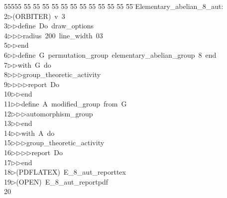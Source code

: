 %
%
\begin{tabbing}
55555 \= 55 \= 55 \= 55 \= 55 \= 55 \= 55 \= 55 \= 55 \= 55 \= 55 \= 55 \= 55 \= \>Elementary\_abelian\_8\_aut:\\[0pt]
2\>$\triangleright$\>(ORBITER)\ v\ 3\ \\[0pt]
3\>$\triangleright$\>$\triangleright$\>define\ Do\ draw\_options\ \\[0pt]
4\>$\triangleright$\>$\triangleright$\>$\triangleright$\>radius\ 200\ line\_width\ 03\ \\[0pt]
5\>$\triangleright$\>$\triangleright$\>end\ \\[0pt]
6\>$\triangleright$\>$\triangleright$\>define\ G\ permutation\_group\ elementary\_abelian\_group\ 8\ end\ \\[0pt]
7\>$\triangleright$\>$\triangleright$\>with\ G\ do\ \\[0pt]
8\>$\triangleright$\>$\triangleright$\>$\triangleright$\>group\_theoretic\_activity\ \\[0pt]
9\>$\triangleright$\>$\triangleright$\>$\triangleright$\>$\triangleright$\>report\ Do\ \\[0pt]
10\>$\triangleright$\>$\triangleright$\>end\ \\[0pt]
11\>$\triangleright$\>$\triangleright$\>define\ A\ modified\_group\ from\ G\ \\[0pt]
12\>$\triangleright$\>$\triangleright$\>$\triangleright$\>automorphism\_group\ \\[0pt]
13\>$\triangleright$\>$\triangleright$\>end\ \\[0pt]
14\>$\triangleright$\>$\triangleright$\>with\ A\ do\ \\[0pt]
15\>$\triangleright$\>$\triangleright$\>$\triangleright$\>group\_theoretic\_activity\ \\[0pt]
16\>$\triangleright$\>$\triangleright$\>$\triangleright$\>$\triangleright$\>report\ Do\ \\[0pt]
17\>$\triangleright$\>$\triangleright$\>end\\[0pt]
18\>$\triangleright$\>(PDFLATEX)\ E\_8\_aut\_reporttex\\[0pt]
19\>$\triangleright$\>(OPEN)\ E\_8\_aut\_reportpdf\\[0pt]
20\>\end{tabbing}
